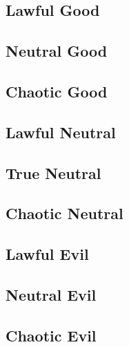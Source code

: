 \documentclass[tikz,openany,11pt,a4paper]{book}
\begin{document}
\subsection{Lawful Good}
\subsection{Neutral Good}
\subsection{Chaotic Good}
\subsection{Lawful Neutral}
\subsection{True Neutral}
\subsection{Chaotic Neutral}
\subsection{Lawful Evil}
\subsection{Neutral Evil}
\subsection{Chaotic Evil}
\end{document}
